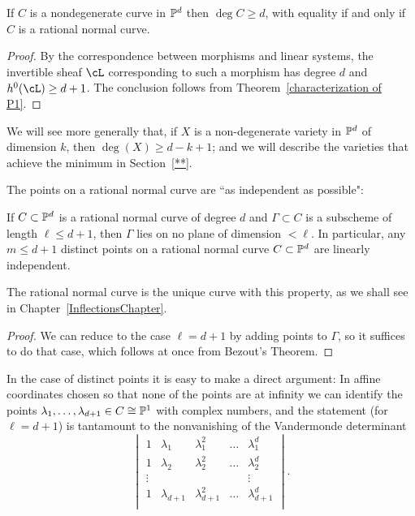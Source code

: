 \begin{proposition}
If $C$ is a nondegenerate curve in $\PP^d$ then $\deg C \geq d$, with equality if and only if $C$ is a  rational normal curve.
\end{proposition}

\begin{proof}
 By the correspondence between morphisms and linear systems, the invertible sheaf $\cL$ corresponding to such a morphism has degree $d$ and
 $h^0(\cL) \geq d+1$. The conclusion follows from Theorem~\ref{characterization of P1}.
\end{proof}

We will see more generally that, if $X$ is a non-degenerate variety in $\PP^d$ of dimension $k$, then $\deg(X) \geq d-k+1$; and we will describe the varieties that achieve the minimum in Section~\ref{**}.

The points on a rational normal curve are ``as independent as possible":

\begin{proposition}
If $C\subset \PP^d$ is a rational normal curve of degree $d$ and $\Gamma\subset C$ is a subscheme of length $\ell \leq d+1$, then
$\Gamma$ lies on no plane of dimension $<\ell$. In particular, any $m \leq d+1$ distinct points on a rational normal curve $C \subset \PP^d$ are linearly independent.
\end{proposition}

The rational normal curve is the unique curve with this property, as we shall see in Chapter~\ref{InflectionsChapter}.

\begin{proof}
We can reduce to the case $\ell = d+1$ by adding points to $\Gamma$, so it suffices to do that case, which follows at once from Bezout's Theorem.
\end{proof}

In the case of distinct points it is easy to make a direct argument: In affine coordinates chosen so that none of the points are
at infinity we can identify the points $\lambda_1,\dots,\lambda_{d+1} \in C \cong \PP^1$ with complex numbers, and the statement (for $\ell = d+1$) is tantamount to the nonvanishing of the Vandermonde determinant
$$
\begin{vmatrix}
1 & \lambda_1 & \lambda_1^2 & \dots & \lambda_1^d \\
1 & \lambda_2 & \lambda_2^2 & \dots & \lambda_2^d \\
\vdots & & & & \vdots \\
1 & \lambda_{d+1} & \lambda_{d+1}^2 & \dots & \lambda_{d+1}^d \\
\end{vmatrix}.
$$


